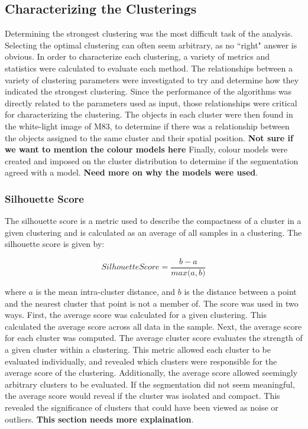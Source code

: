 \subsection{Characterizing the Clusterings}
Determining the strongest clustering was the most difficult task of the analysis.
Selecting the optimal clustering can often seem arbitrary, as no ``right" answer is obvious.
In order to characterize each clustering, a variety of metrics and statistics were calculated to evaluate each method.
The relationships between a variety of clustering parameters were investigated to try and determine how they indicated the strongest clustering.
Since the performance of the algorithms was directly related to the parameters used as input, those relationships were critical for characterizing the clustering.
The objects in each cluster were then found in the white-light image of M83, to determine if there was a relationship between the objects assigned to the same cluster and their spatial position.
\textbf{Not sure if we want to mention the colour models here}
Finally, colour models were created and imposed on the cluster distribution to determine if the segmentation agreed with a model. \textbf{Need more on why the models were used}.

\subsubsection{Silhouette Score}
The silhouette score is a metric used to describe the compactness of a cluster in a given clustering and is calculated as an average of all samples in a clustering.  
The silhouette score is given by:

\begin{equation}
\label{eq:ss}
Silhouette Score = \frac{b - a}{\textit{max}\big(a, b\big)}
\end{equation}

where $a$ is the mean intra-cluster distance, and $b$ is the distance between a point and the nearest cluster that point is not a member of.
The score was used in two ways.
First, the average score was calculated for a given clustering.
This calculated the average score across all data in the sample.
Next, the average score for each cluster was computed.
The average cluster score evaluates the strength of a given cluster within a clustering.
This metric allowed each cluster to be evaluated individually, and revealed which clusters were responsible for the average score of the clustering.
Additionally, the average score allowed seemingly arbitrary clusters to be evaluated.
If the segmentation did not seem meaningful, the average score would reveal if the cluster was isolated and compact.
This revealed the significance of clusters that could have been viewed as noise or outliers. \textbf{This section needs more explaination}.

